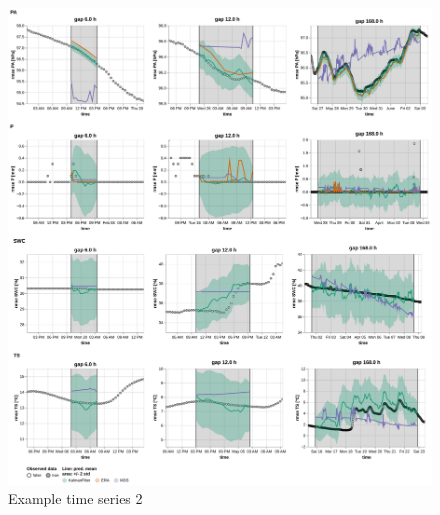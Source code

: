 \documentclass{article}
\newcommand{\imgwidth}{6in}
\begin{document}
\begin{figure}
\centerline{\includegraphics[width=\imgwidth]{images2/timeseries_2_1}}
\caption{Example time series 2}
\label{fig:ts_2-2}
\end{figure}
\end{document}
